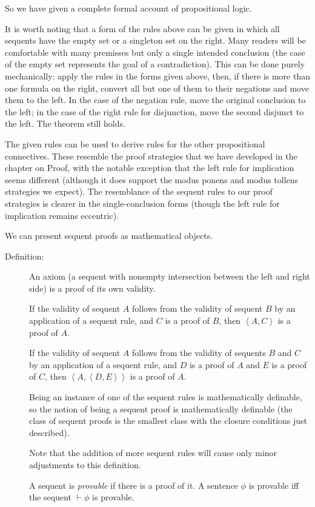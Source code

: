 \documentclass[12pt]{book}
\begin{document}
So we have given a complete formal account of propositional logic.

It is worth noting that a form of the rules above can be given in
which all sequents have the empty set or a singleton set on the right.
Many readers will be comfortable with many premisses but only a single
intended conclusion (the case of the empty set represents the goal of
a contradiction).  This can be done purely mechanically: apply the
rules in the forms given above, then, if there is more than one
formula on the right, convert all but one of them to their negations
and move them to the left.  In the case of the negation rule, move the
original conclusion to the left; in the case of the right rule for
disjunction, move the second disjunct to the left.  The theorem still
holds.

The given rules can be used to derive rules for the other
propositional connectives.  These resemble the proof strategies that
we have developed in the chapter on Proof, with the notable exception
that the left rule for implication seems different (although it does
support the modus ponens and modus tollens strategies we expect).  The
resemblance of the sequent rules to our proof strategies is clearer in
the single-conclusion forms (though the left rule for implication
remains eccentric).

We can present sequent proofs as mathematical objects.

\begin{description}

\item[Definition:] 

An axiom (a sequent with nonempty intersection between the left and
right side) is a proof of its own validity.

If the validity of sequent $A$ follows from the validity of sequent
$B$ by an application of a sequent rule, and $C$ is a proof of $B$,
then $\left<A,C\right>$ is a proof of $A$.

If the validity of sequent $A$ follows from the validity of sequents
$B$ and $C$ by an application of a sequent rule, and $D$ is a proof of
$A$ and $E$ is a proof of $C$, then $\left<A,\left<D,E\right>\right>$
is a proof of $A$.

Being an instance of one of the sequent rules is mathematically
definable, so the notion of being a sequent proof is mathematically
definable (the class of sequent proofs is the smallest class with the
closure conditions just described).

Note that the addition of more sequent rules will cause only minor
adjustments to this definition.

A sequent is {\em provable\/} if there is a proof of it.  A sentence
$\phi$ is provable iff the sequent $\vdash \phi$ is provable.

\end{description}
\end{document}

